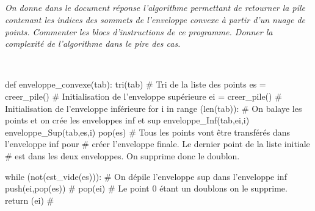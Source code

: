 \documentclass[10pt,fleqn]{article} %
\begin{document}
\subparagraph{}
\textit{On donne dans le document réponse l'algorithme permettant de retourner la pile contenant les indices des sommets de l'enveloppe convexe à partir d'un nuage de points. Commenter les blocs d'instructions de ce programme. Donner la complexité de l'algorithme dans le pire des cas. }
\ifprof
\begin{corrige}~\\
\begin{py}
\begin{python}
def enveloppe_convexe(tab):
    tri(tab)                         # Tri de la liste des points
    es = creer_pile()                # Initialisation de l'enveloppe supérieure
    ei = creer_pile()                # Initialisation de l'enveloppe inférieure
    for i in range (len(tab)):       # On balaye les points et on crée les enveloppes inf et sup
        enveloppe_Inf(tab,ei,i)
        enveloppe_Sup(tab,es,i)
    pop(es)                          # Tous les points vont être transférés dans l'enveloppe inf pour 
                                     # créer l'enveloppe finale. Le dernier point de la liste initiale 
                                     # est dans les deux enveloppes. On supprime donc le doublon.

    while (not(est_vide(es))):       # On dépile l'enveloppe sup dans l'enveloppe inf
        push(ei,pop(es))             # 
    pop(ei)                          # Le point 0 étant un doublons on le supprime.
    return (ei)                      # 
\end{python}
\end{py}
\end{corrige}
\else
\fi
\end{document}
